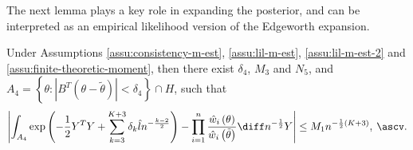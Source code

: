 The next lemma plays a key role in expanding the posterior, and can be interpreted as an empirical likelihood version of the Edgeworth expansion. 
\begin{lemma}
\label{lem:central-expansion-lik-2} Under  Assumptions \ref{assu:consistency-m-est}, \ref{assu:lil-m-est}, \ref{assu:lil-m-est-2} and 
\ref{assu:finite-theoretic-moment}, then there exist $\delta_{4}$, $M_{3}$
and $N_{5}$, 
and $ A_4=\left\{ \theta:\left|B^T\left(\theta-\tilde{\theta}\right)\right|<\delta_{4}\right\} \cap H $,
 such that 
\[
\left|\int_{A_4}\exp\left(-\frac{1}{2}Y^{T}Y+\sum_{k=3}^{K+3}\delta_{k}\hat{l}n^{-\frac{k-2}{2}}\right)-\prod_{i=1}^{n}\frac{\hat{w}_{i}\left(\theta\right)}{\hat{w}_{i}\left(\tilde{\theta}\right)}\diff n^{-\frac{1}{2}}Y\right|\le M_{1}n^{-\frac{1}{2}\left(K+3\right)},\:\ascv.
\]
\end{lemma}
